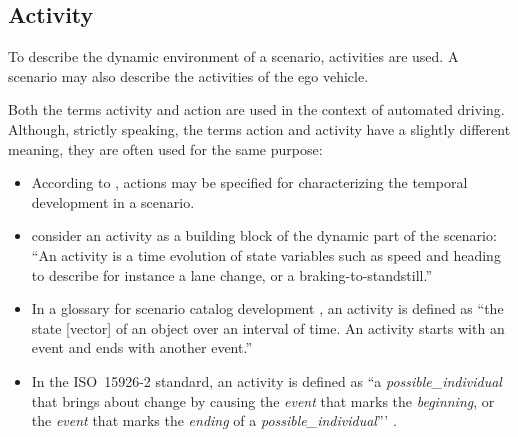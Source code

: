 


\subsection{Activity}
\label{sec:activity}

To describe the dynamic environment of a scenario, activities are used. A scenario may also describe the activities of the ego vehicle. 

Both the terms activity \autocite{geyer2014, elrofai2018scenario, childress2015using, catapult2018musicc, sigsim2019glossary} and action \autocite{geyer2014, ulbrich2015, bagschik2017ontology} are used in the context of automated driving. Although, strictly speaking, the terms action and activity have a slightly different meaning, they are often used for the same purpose:
\begin{itemize}
	\item According to \textcite{ulbrich2015}, actions may be specified for characterizing the temporal development in a scenario.
	\item \textcite{elrofai2018scenario} consider an activity as a building block of the dynamic part of the scenario: ``An activity is a time evolution of state variables such as speed and heading to describe for instance a lane change, or a braking-to-standstill.''
	\item In a glossary for scenario catalog development \autocite{catapult2018musicc}, an activity is defined as ``the state [vector] of an object over an interval of time. An activity starts with an event and ends with another event.''
	\item \cstarte In the ISO~15926-2 standard, an activity is defined as ``a \textit{possible\_individual} that brings about change by causing the \textit{event} that marks the \textit{beginning}, or the \textit{event} that marks the \textit{ending} of a \textit{possible\_individual}''' \autocite{batres2007upper}. \cende
\end{itemize}


